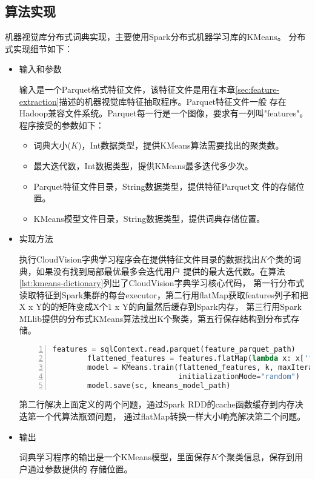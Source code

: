 \subsection*{算法实现}
机器视觉库分布式词典实现，主要使用Spark分布式机器学习库的KMeans。
分布式实现细节如下：
\
\begin{itemize}
  \item 输入和参数

        输入是一个Parquet格式特征文件，该特征文件是用在本章\ref{sec:feature-extraction}描述的机器视觉库特征抽取程序。Parquet特征文件一般
        存在Hadoop兼容文件系统。Parquet每一行是一个图像，要求有一列叫"features"。
        程序接受的参数如下：
        \begin{itemize}
          \item 词典大小($K$)，Int数据类型，提供KMeans算法需要找出的聚类数。
          \item 最大迭代数，Int数据类型，提供KMeans最多迭代多少次。
          \item Parquet特征文件目录，String数据类型，提供特征Parquet文
                件的存储位置。
          \item KMeans模型文件目录，String数据类型，提供词典存储位置。
        \end{itemize}

  \item 实现方法

        执行CloudVision字典学习程序会在提供特征文件目录的数据找出$K$个类的词典，如果没有找到局部最优最多会迭代用户
        提供的最大迭代数。在算法\ref{lst:kmeans-dictionary}列出了CloudVision字典学习核心代码，
        第一行分布式读取特征到Spark集群的每台executor，第二行用flatMap获取features列子和把X x Y的的矩阵变成X个1 x Y的向量然后缓存到Spark内存，
        第三行用Spark MLlib提供的分布式KMeans算法找出K个聚类，第五行保存结构到分布式存储。
        \begin{lstlisting}[language=Python,
                           basicstyle=\small,
                           showstringspaces=false,
                           numbers=left,
                           caption={词典学习核心代码},
                           label={lst:kmeans-dictionary}]
        features = sqlContext.read.parquet(feature_parquet_path)
        flattened_features = features.flatMap(lambda x: x['features']).cache()
        model = KMeans.train(flattened_features, k, maxIterations=maxIter,
                             initializationMode="random")
        model.save(sc, kmeans_model_path)
        \end{lstlisting}
        第二行解决上面定义的两个问题，通过Spark RDD的cache函数缓存到内存决迭第一个代算法瓶颈问题，
        通过flatMap转换一样大小响亮解决第二个问题。


  \item 输出

        词典学习程序的输出是一个KMeans模型，里面保存$K$个聚类信息，保存到用户通过参数提供的
        存储位置。
\end{itemize}


